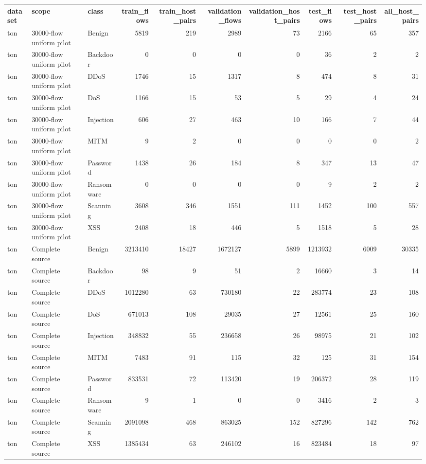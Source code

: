 \begin{tabular}{lllrrrrrrr}
\toprule
dataset & scope & class & train\_flows & train\_host\_pairs & validation\_flows & validation\_host\_pairs & test\_flows & test\_host\_pairs & all\_host\_pairs \\
\midrule
ton & 30000-flow uniform pilot & Benign & 5819 & 219 & 2989 & 73 & 2166 & 65 & 357 \\
ton & 30000-flow uniform pilot & Backdoor & 0 & 0 & 0 & 0 & 36 & 2 & 2 \\
ton & 30000-flow uniform pilot & DDoS & 1746 & 15 & 1317 & 8 & 474 & 8 & 31 \\
ton & 30000-flow uniform pilot & DoS & 1166 & 15 & 53 & 5 & 29 & 4 & 24 \\
ton & 30000-flow uniform pilot & Injection & 606 & 27 & 463 & 10 & 166 & 7 & 44 \\
ton & 30000-flow uniform pilot & MITM & 9 & 2 & 0 & 0 & 0 & 0 & 2 \\
ton & 30000-flow uniform pilot & Password & 1438 & 26 & 184 & 8 & 347 & 13 & 47 \\
ton & 30000-flow uniform pilot & Ransomware & 0 & 0 & 0 & 0 & 9 & 2 & 2 \\
ton & 30000-flow uniform pilot & Scanning & 3608 & 346 & 1551 & 111 & 1452 & 100 & 557 \\
ton & 30000-flow uniform pilot & XSS & 2408 & 18 & 446 & 5 & 1518 & 5 & 28 \\
ton & Complete source & Benign & 3213410 & 18427 & 1672127 & 5899 & 1213932 & 6009 & 30335 \\
ton & Complete source & Backdoor & 98 & 9 & 51 & 2 & 16660 & 3 & 14 \\
ton & Complete source & DDoS & 1012280 & 63 & 730180 & 22 & 283774 & 23 & 108 \\
ton & Complete source & DoS & 671013 & 108 & 29035 & 27 & 12561 & 25 & 160 \\
ton & Complete source & Injection & 348832 & 55 & 236658 & 26 & 98975 & 21 & 102 \\
ton & Complete source & MITM & 7483 & 91 & 115 & 32 & 125 & 31 & 154 \\
ton & Complete source & Password & 833531 & 72 & 113420 & 19 & 206372 & 28 & 119 \\
ton & Complete source & Ransomware & 9 & 1 & 0 & 0 & 3416 & 2 & 3 \\
ton & Complete source & Scanning & 2091098 & 468 & 863025 & 152 & 827296 & 142 & 762 \\
ton & Complete source & XSS & 1385434 & 63 & 246102 & 16 & 823484 & 18 & 97 \\

\end{tabular}
